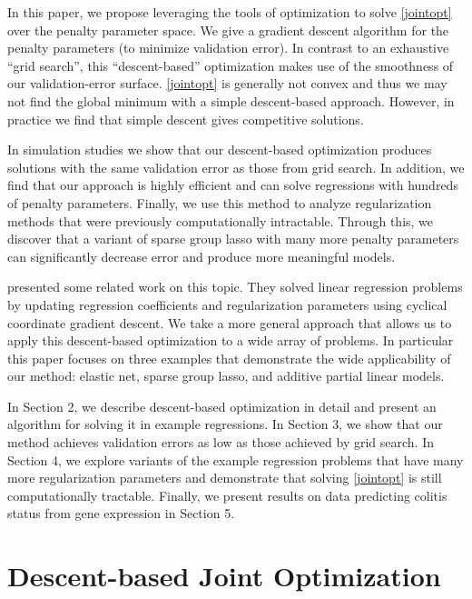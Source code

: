 \documentclass[10pt,letterpaper]{article}
\begin{document}
In this paper, we propose leveraging the tools of optimization to solve \eqref{jointopt} over the penalty parameter space. We give a gradient descent algorithm for the penalty parameters (to minimize validation error). In contrast to an exhaustive ``grid search'', this ``descent-based'' optimization makes use of the smoothness of our validation-error surface. \eqref{jointopt} is generally not convex and thus we may not find the global minimum with a simple descent-based approach. However, in practice we find that simple descent gives competitive solutions.

In simulation studies we show that our descent-based optimization produces solutions with the same validation error as those from grid search. In addition, we find that our approach is highly efficient and can solve regressions with hundreds of penalty parameters. Finally, we use this method to analyze regularization methods that were previously computationally intractable. Through this, we discover that a variant of sparse group lasso with many more penalty parameters can significantly decrease error and produce more meaningful models.

\citet{lorbert2010descent} presented some related work on this topic. They solved linear regression problems by updating regression coefficients and regularization parameters using cyclical coordinate gradient descent. We take a more general approach that allows us to apply this descent-based optimization to a wide array of problems. In particular this paper focuses on three examples that demonstrate the wide applicability of our method: elastic net, sparse group lasso, and additive partial linear models.

In Section 2, we describe descent-based optimization in detail and present an algorithm for solving it in example regressions. In Section 3, we show that our method achieves validation errors as low as those achieved by grid search. In Section 4, we explore variants of the example regression problems that have many more regularization parameters and demonstrate that solving \eqref{jointopt} is still computationally tractable. Finally, we present results on data predicting colitis status from gene expression in Section 5.

\section{Descent-based Joint Optimization}
\end{document}
